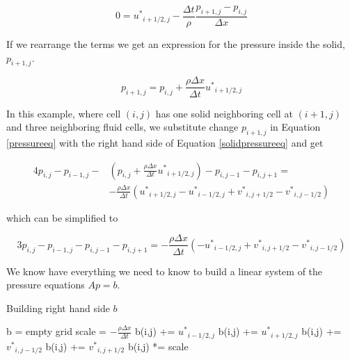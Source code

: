 \begin{equation}
0 = {u^*}_{i+1/2,j} - \frac{\Delta t }{\rho}\frac{p_{i+1,j} - p_{i,j}}{\Delta x}
\label{solidveleq}
\end{equation}

If we rearrange the terms we get an expression for the pressure inside the solid, $p_{i+1,j}$.

\begin{equation}
p_{i+1,j} = p_{i,j} + \frac{\rho \Delta x}{\Delta t}{u^*}_{i+1/2,j}
\label{solidpressureeq}
\end{equation}

In this example, where cell $(i,j)$ has one solid neighboring cell at $(i+1,j)$ and three neighboring fluid cells, we substitute change $p_{i+1,j}$ in Equation \ref{pressureeq} with the right hand side of Equation \ref{solidpressureeq} and get

\begin{equation}
\begin{split}
4p_{i,j} - p_{i-1,j} - &(p_{i,j} + \frac{\rho \Delta x}{\Delta t}{u^*}_{i+1/2,j}) - p_{i,j-1} - p_{i,j+1} = \\ &-\frac{\rho \Delta x}{\Delta t}({u^*}_{i+1/2,j} - {u^*}_{i-1/2,j} + {v^*}_{i,j+1/2} - {v^*}_{i,j-1/2})
\end{split}
\label{solidpressureeqfull}
\end{equation}

which can be simplified to

\begin{equation}
3p_{i,j} - p_{i-1,j} - p_{i,j-1} - p_{i,j+1} = -\frac{\rho \Delta x}{\Delta t}(- {u^*}_{i-1/2,j} + {v^*}_{i,j+1/2} - {v^*}_{i,j-1/2})
\end{equation}

We know have everything we need to know to build a linear system of the pressure equations $Ap = b$.

\begin{algorithm}
\caption{Building right hand side $b$}
\begin{algorithmic}
\STATE b = empty grid
\STATE scale = $-\frac{\rho\Delta x}{\Delta t}$
\STATE b(i,j) += ${u^*}_{i-1/2,j}$
\ENDIF
{}
\STATE b(i,j) += ${u^*}_{i+1/2,j}$
\ENDIF
{}
\STATE b(i,j) += ${v^*}_{i,j-1/2}$
\ENDIF
{}
\STATE b(i,j) += ${v^*}_{i,j+1/2}$
\ENDIF
\STATE b(i,j) *= scale
\ENDFOR
\ENDFOR
\end{algorithmic}
\label{build rhs}
\end{algorithm}

